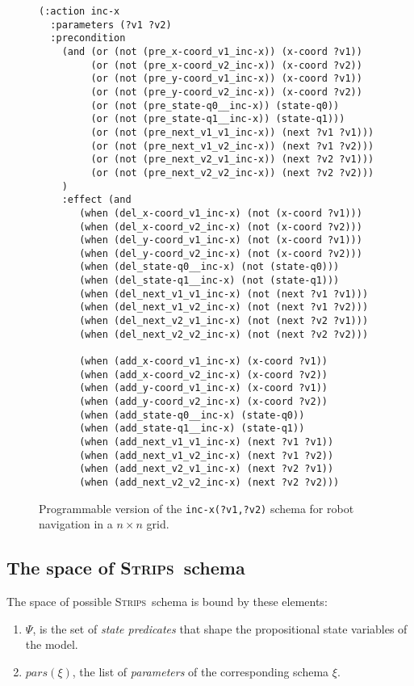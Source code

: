 \documentclass[letterpaper]{article} %
\newcommand{\strips}{\textsc{Strips}}     %
\begin{document}
\begin{figure}
  \begin{tiny}  
  \begin{verbatim}
(:action inc-x
  :parameters (?v1 ?v2)
  :precondition
    (and (or (not (pre_x-coord_v1_inc-x)) (x-coord ?v1))
         (or (not (pre_x-coord_v2_inc-x)) (x-coord ?v2))
         (or (not (pre_y-coord_v1_inc-x)) (x-coord ?v1))                       
         (or (not (pre_y-coord_v2_inc-x)) (x-coord ?v2))
         (or (not (pre_state-q0__inc-x)) (state-q0))
         (or (not (pre_state-q1__inc-x)) (state-q1)))
         (or (not (pre_next_v1_v1_inc-x)) (next ?v1 ?v1)))
         (or (not (pre_next_v1_v2_inc-x)) (next ?v1 ?v2)))
         (or (not (pre_next_v2_v1_inc-x)) (next ?v2 ?v1)))
         (or (not (pre_next_v2_v2_inc-x)) (next ?v2 ?v2)))         
    )
    :effect (and
       (when (del_x-coord_v1_inc-x) (not (x-coord ?v1)))
       (when (del_x-coord_v2_inc-x) (not (x-coord ?v2)))
       (when (del_y-coord_v1_inc-x) (not (x-coord ?v1)))
       (when (del_y-coord_v2_inc-x) (not (x-coord ?v2)))
       (when (del_state-q0__inc-x) (not (state-q0)))
       (when (del_state-q1__inc-x) (not (state-q1)))
       (when (del_next_v1_v1_inc-x) (not (next ?v1 ?v1)))
       (when (del_next_v1_v2_inc-x) (not (next ?v1 ?v2)))
       (when (del_next_v2_v1_inc-x) (not (next ?v2 ?v1)))
       (when (del_next_v2_v2_inc-x) (not (next ?v2 ?v2)))
       
       (when (add_x-coord_v1_inc-x) (x-coord ?v1))
       (when (add_x-coord_v2_inc-x) (x-coord ?v2))
       (when (add_y-coord_v1_inc-x) (x-coord ?v1))
       (when (add_y-coord_v2_inc-x) (x-coord ?v2))
       (when (add_state-q0__inc-x) (state-q0))
       (when (add_state-q1__inc-x) (state-q1))
       (when (add_next_v1_v1_inc-x) (next ?v1 ?v1))
       (when (add_next_v1_v2_inc-x) (next ?v1 ?v2))
       (when (add_next_v2_v1_inc-x) (next ?v2 ?v1))
       (when (add_next_v2_v2_inc-x) (next ?v2 ?v2)))
  \end{verbatim}           
  \end{tiny}  
 \caption{\small Programmable version of the {\tt\small inc-x(?v1,?v2)} schema for robot navigation in a $n\times n$ grid.}
\label{fig:programmable}
\end{figure}


\subsection{The space of \strips\ schema}
The space of possible \strips\ schema is bound by these elements:
\begin{enumerate}
\item $\Psi$, is the set of {\em state predicates} that shape the propositional state variables of the model.
\item $pars(\xi)$, the list of {\em parameters} of the corresponding schema $\xi$. 
\end{enumerate}
\end{document}
